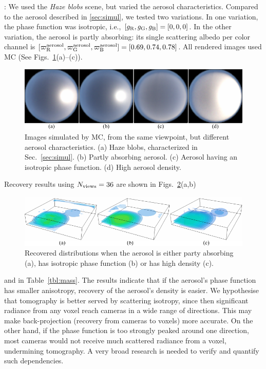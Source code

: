 \documentclass[10pt,letterpaper]{article}
\newcommand{\yoavcomment}[1]{}
\renewcommand{\yoavcomment}[1]{#1} %
\begin{document}
: We used the {\em Haze blobs} scene, but varied the
aerosol characteristics. Compared to the aerosol described in \cref{sec:simul}, we tested two variations. In one variation, the phase function was isotropic, i.e.,
$[g_{\rm R},g_{\rm G},g_{\rm B}]=[0,0,0]$. In the other variation, the aerosol is partly absorbing: its single scattering albedo per color channel is
$[\varpi^{\rm aerosol}_{\rm R},\varpi^{\rm aerosol}_{\rm G},\varpi^{\rm aerosol}_{\rm B}]=
[0.69,0.74,0.78]$.  All rendered images used MC (See Figs.~\ref{fig:simulation_particles}(a)--(c)).
\begin{figure}[b]
  \centering
  \yoavcomment{\includegraphics{images/simulation_particles.pdf}}
  \caption{\small Images simulated by MC, from the same viewpoint, but different
  aerosol characteristics. (a) Haze blobs, characterized in Sec.~\ref{sec:simul}. 
  (b) Partly absorbing aerosol. (c) Aerosol having an isotropic phase function. (d) High aerosol density.}
  \label{fig:simulation_particles}
\end{figure}
Recovery results using $N_{\rm views}=36$ are shown in Figs.~\ref{fig:reconstructions}(a,b)
\begin{figure}[b]
  \centering
  \yoavcomment{\includegraphics{images/reconstructions.pdf}}
  \caption{\small  Recovered distributions when the aerosol is either party absorbing (a),
    has isotropic phase function (b) or has high density (c).}
  \label{fig:reconstructions}
\end{figure}
and in Table~\ref{tbl:mass}. The results indicate that if the aerosol's phase function has smaller anisotropy, recovery of the aerosol's density is easier. We hypothesise that tomography is better served by scattering isotropy, since then significant radiance from any voxel reach cameras in a wide range of directions. This may make back-projection (recovery from cameras to voxels) more accurate. On the other hand, if the phase function is too strongly peaked around one direction, most cameras would not receive much scattered radiance from a voxel, undermining tomography. A very broad research is needed to verify and quantify such dependencies.\\
\end{document}
